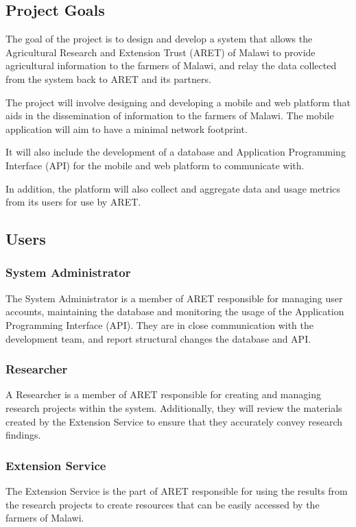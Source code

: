 \documentclass[12pt,letterpaper]{article}
\begin{document}
\subsection{Project Goals}

The goal of the project is to design and develop a system that allows the Agricultural Research and Extension Trust (ARET) of Malawi to provide agricultural information to the farmers of Malawi, and relay the data collected from the system back to ARET and its partners.

The project will involve designing and developing a mobile and web platform that aids in the dissemination of information to the farmers of Malawi. The mobile application will aim to have a minimal network footprint. \par

It will also include the development of a database and Application Programming Interface (API) for the mobile and web platform to communicate with. \par

In addition, the platform will also collect and aggregate data and usage metrics from its users for use by ARET.

\subsection{Users}
\subsubsection*{System Administrator}
The System Administrator is a member of ARET responsible for managing user accounts, maintaining the database and monitoring the usage of the Application Programming Interface (API). They are in close communication with the development team, and report structural changes the database and API.

\subsubsection*{Researcher}
A Researcher is a member of ARET responsible for creating and managing research projects within the system. Additionally, they will review the materials created by the Extension Service to ensure that they accurately convey research findings.

\subsubsection*{Extension Service}
The Extension Service is the part of ARET responsible for using the results from the research projects to create resources that can be easily accessed by the farmers of Malawi.
\end{document}
